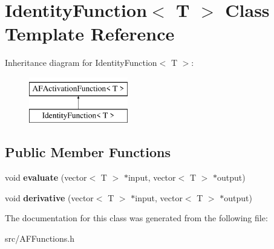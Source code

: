 \hypertarget{classIdentityFunction}{}\section{Identity\+Function$<$ T $>$ Class Template Reference}
\label{classIdentityFunction}
Inheritance diagram for Identity\+Function$<$ T $>$\+:\begin{figure}[H]
\begin{center}
\leavevmode
\includegraphics[height=2.000000cm]{classIdentityFunction}
\end{center}
\end{figure}
\subsection*{Public Member Functions}
\begin{DoxyCompactItemize}
\item 
\mbox{\label{classIdentityFunction_a28558009eede686c44accf509bac0761}} 
void {\bfseries evaluate} (vector$<$ T $>$ $\ast$input, vector$<$ T $>$ $\ast$output)
\item 
\mbox{\label{classIdentityFunction_a62a12629a5cd78e7788d0a362e8d4b64}} 
void {\bfseries derivative} (vector$<$ T $>$ $\ast$input, vector$<$ T $>$ $\ast$output)
\end{DoxyCompactItemize}


The documentation for this class was generated from the following file\+:\begin{DoxyCompactItemize}
\item 
src/A\+F\+Functions.\+h\end{DoxyCompactItemize}
